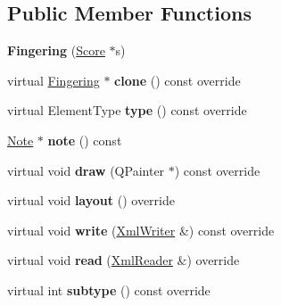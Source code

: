 \subsection*{Public Member Functions}
\begin{DoxyCompactItemize}
\item 
\mbox{\label{class_ms_1_1_fingering_a029b34156182d1ed1b6867003091a46c}} 
{\bfseries Fingering} (\hyperlink{class_ms_1_1_score}{Score} $\ast$s)
\item 
\mbox{\label{class_ms_1_1_fingering_ad1098e15b7d214d5a12e7db00c95758f}} 
virtual \hyperlink{class_ms_1_1_fingering}{Fingering} $\ast$ {\bfseries clone} () const override
\item 
\mbox{\label{class_ms_1_1_fingering_a00cb37793cc4a4c70ca408e815228adf}} 
virtual Element\+Type {\bfseries type} () const override
\item 
\mbox{\label{class_ms_1_1_fingering_ac7628ca88b364fbb19a5e840e0da4639}} 
\hyperlink{class_ms_1_1_note}{Note} $\ast$ {\bfseries note} () const
\item 
\mbox{\label{class_ms_1_1_fingering_ace6a5ab8d24a900fd88a8d3f21587357}} 
virtual void {\bfseries draw} (Q\+Painter $\ast$) const override
\item 
\mbox{\label{class_ms_1_1_fingering_a946c0afb5e75b8952f7a7cd9a6274239}} 
virtual void {\bfseries layout} () override
\item 
\mbox{\label{class_ms_1_1_fingering_a31248e6e225b41ab97bae1e965c7fd12}} 
virtual void {\bfseries write} (\hyperlink{class_ms_1_1_xml_writer}{Xml\+Writer} \&) const override
\item 
\mbox{\label{class_ms_1_1_fingering_a9bb76355ce4875722e0bb5c7c678b713}} 
virtual void {\bfseries read} (\hyperlink{class_ms_1_1_xml_reader}{Xml\+Reader} \&) override
\item 
\mbox{\label{class_ms_1_1_fingering_a0ed9b1f9f00bd365870437fe79e30a59}} 
virtual int {\bfseries subtype} () const override

\end{DoxyCompactItemize}
